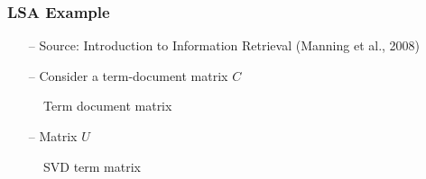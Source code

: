 \documentclass{beamer}
\begin{document}
\begin{frame}[noframenumbering] 
\frametitle{LSA Example}
\begin{itemize}
\item[--] Source: Introduction to Information Retrieval (Manning et al., 2008)
\item[--] Consider a term-document matrix $C$
\end{itemize}
\begin{figure}[h] 
\centering
{}
\centering
\caption{Term document matrix}
\label{DTM_LSA}
\end{figure}

\begin{itemize}
\item[--] Matrix $U$
\end{itemize}
\begin{figure}[h] 
\centering
{}
\centering
\caption{SVD term matrix}
\label{U_LSA}
\end{figure}

\end{frame}
\end{document}
